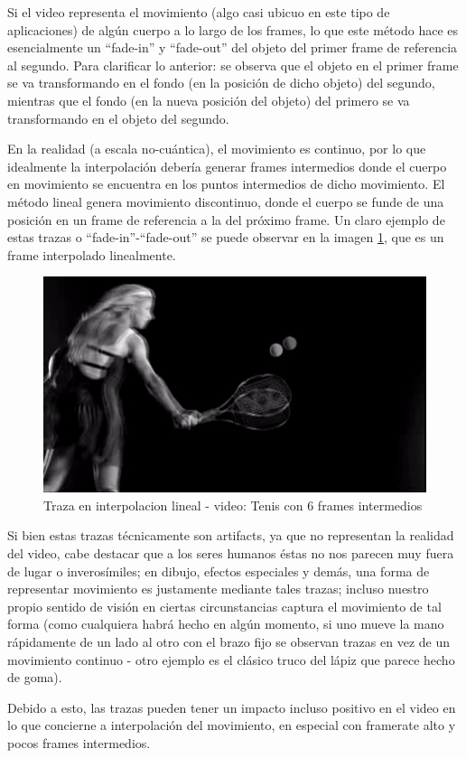 \par Si el video representa el movimiento (algo casi ubicuo en este tipo de aplicaciones) de alg\'un cuerpo a lo largo de los frames, lo que este m\'etodo hace es esencialmente un ``fade-in'' y ``fade-out'' del objeto del primer frame de referencia al segundo.
Para clarificar lo anterior: se observa que el objeto en el primer frame se va transformando en el fondo (en la posici\'on de dicho objeto) del segundo, mientras que el fondo (en la nueva posici\'on del objeto) del primero se va transformando en el objeto del segundo.
\par En la realidad (a escala no-cu\'antica), el movimiento es continuo, por lo que idealmente la interpolaci\'on deber\'ia generar frames intermedios donde el cuerpo en movimiento se encuentra en los puntos intermedios de dicho movimiento.
El m\'etodo lineal genera movimiento discontinuo, donde el cuerpo se funde de una posici\'on en un frame de referencia a la del pr\'oximo frame.
Un claro ejemplo de estas trazas o ``fade-in''-``fade-out'' se puede observar en la imagen \ref{TenisTrazaLineal}, que es un frame interpolado linealmente.

\FloatBarrier
\begin{figure}[h]
\begin{center}
\caption{Traza en interpolacion lineal - video: Tenis con 6 frames intermedios}
\label{TenisTrazaLineal}
\includegraphics[width=0.9\columnwidth]{imagenes/cualitativos/TTL.png}
\end{center}
\end{figure}
\FloatBarrier

\par Si bien estas trazas t\'ecnicamente son artifacts, ya que no representan la realidad del video, cabe destacar que a los seres humanos \'estas no nos parecen muy fuera de lugar o inveros\'imiles; en dibujo, efectos especiales y dem\'as, una forma de representar movimiento es justamente mediante tales trazas; incluso nuestro propio sentido de visi\'on en ciertas circunstancias captura el movimiento de tal forma (como cualquiera habr\'a hecho en alg\'un momento, si uno mueve la mano r\'apidamente de un lado al otro con el brazo fijo se observan trazas en vez de un movimiento continuo - otro ejemplo es el cl\'asico truco del l\'apiz que parece hecho de goma). 
\par Debido a esto, las trazas pueden tener un impacto incluso positivo en el video en lo que concierne a interpolaci\'on del movimiento, en especial con framerate alto y pocos frames intermedios.

